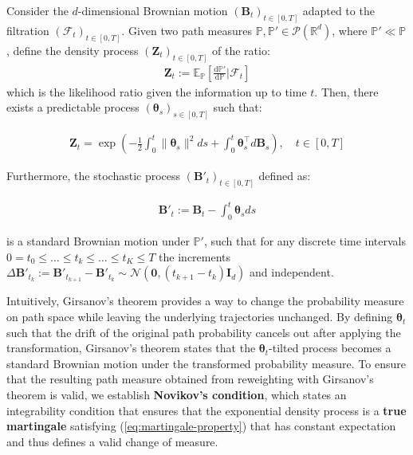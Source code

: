 \documentclass{article}
\newcommand{\boldtext}[1]{\textbf{\textcolor{MyGreen}{#1}}}
\begin{document}
\begin{theorem}\label{theorem:girsanov}
    Consider the $d$-dimensional Brownian motion $(\boldsymbol{B}_t)_{t\in [0,T]}$ adapted to the filtration $(\mathcal{F}_t)_{t\in [0,T]}$. Given two path measures $\mathbb{P}, \mathbb{P}'\in \mathcal{P}(\mathbb{R}^d)$, where $\mathbb{P}'\ll\mathbb{P}$, define the density process $(\boldsymbol{Z}_t)_{t\in [0,T]}$ of the ratio:
    \begin{align}
        \boldsymbol{Z}_t:= \mathbb{E}_{\mathbb{P}}\left[\frac{\mathrm{d}\mathbb{P}'}{\mathrm{d}\mathbb{P}}\bigg|\mathcal{F}_t\right]
    \end{align}
    which is the likelihood ratio given the information up to time $t$. Then, there exists a predictable process $(\boldsymbol{\theta}_s)_{s\in[0,T]}$ such that:
    \begin{small}
    \begin{align}
        \boldsymbol{Z}_t=\exp\left(-\frac{1}{2}\int_0^t\|\boldsymbol{\theta}_s\|^2ds+\int_0^t\boldsymbol{\theta}_s^\top d\boldsymbol{B}_s\right), \quad t\in [0,T]\label{eq:girsanov-proof1}
    \end{align}
    \end{small}
    Furthermore, the stochastic process $(\boldsymbol{B}'_t)_{t\in [0,T]}$ defined as:
    \begin{small}
    \begin{align}
        \boldsymbol{B}'_t:=\boldsymbol{B}_t-\int_0^t\boldsymbol{\theta}_sds\tag{Girsanov's Theorem}\label{eq:girsanov-proof2}
    \end{align}
    \end{small}
    is a standard Brownian motion under $\mathbb{P}'$, such that for any discrete time intervals $0=t_0\leq \dots \leq t_k\leq \dots \leq t_K\leq T$ the increments $\Delta \boldsymbol{B}'_{t_k}:=\boldsymbol{B}'_{t_{k+1}}-\boldsymbol{B}'_{t_k}\sim \mathcal{N}(\boldsymbol{0}, (t_{k+1}-t_k)\boldsymbol{I}_d)$ and independent. 
\end{theorem}

Intuitively, Girsanov's theorem provides a way to change the probability measure on path space while leaving the underlying trajectories unchanged. By defining $\boldsymbol{\theta}_t$ such that the drift of the original path probability cancels out after applying the transformation, Girsanov's theorem states that the $\boldsymbol{\theta}_t$-tilted process becomes a standard Brownian motion under the transformed probability measure. To ensure that the resulting path measure obtained from reweighting with Girsanov's theorem is valid, we establish \boldtext{Novikov’s condition}, which states an integrability condition that ensures that the exponential density process is a \textbf{true martingale} satisfying (\ref{eq:martingale-property}) that has constant expectation and thus defines a valid change of measure.
\end{document}
